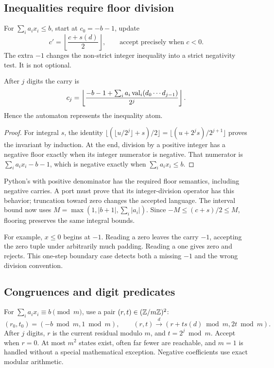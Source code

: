 \subsection{Inequalities require floor division}
For \(\sum_i a_i x_i\le b\), start at \(c_0=-b-1\), update
\begin{equation}\label{eq:le-step}
 c' = \left\lfloor\frac{c+s(d)}2\right\rfloor,
 \qquad\text{accept precisely when }c<0.
\end{equation}
The extra \(-1\) changes the non-strict integer inequality into a strict negativity test. It is not optional.

\begin{lemma}
After \(j\) digits the carry is
\[
 c_j=\left\lfloor\frac{-b-1+\sum_i a_i\operatorname{val}_i(d_0\cdots d_{j-1})}{2^j}\right\rfloor.
\]
Hence the automaton represents the inequality atom.
\end{lemma}
\begin{proof}
For integral \(s\), the identity
\(\lfloor(\lfloor u/2^j\rfloor+s)/2\rfloor
=\lfloor(u+2^j s)/2^{j+1}\rfloor\)
proves the invariant by induction. At the end, division by a positive integer has a negative floor exactly when its integer numerator is negative. That numerator is \(\sum_i a_i x_i-b-1\), which is negative exactly when \(\sum_i a_i x_i\le b\).
\end{proof}

Python's \code{//} with positive denominator has the required floor semantics, including negative carries. A port must prove that its integer-division operator has this behavior; truncation toward zero changes the accepted language. The interval bound now uses \(M=\max(1,|b+1|,\sum_i|a_i|)\). Since \(-M\le(c+s)/2\le M\), flooring preserves the same integral bounds.

For example, \(x\le0\) begins at \(-1\). Reading a zero leaves the carry \(-1\), accepting the zero tuple under arbitrarily much padding. Reading a one gives zero and rejects. This one-step boundary case detects both a missing \(-1\) and the wrong division convention.

\subsection{Congruences and digit predicates}
For \(\sum_i a_i x_i\equiv b\pmod m\), use a pair \((r,t)\in(\mathbb Z/m\mathbb Z)^2\):
\[
 (r_0,t_0)=(-b\bmod m,1\bmod m),\qquad
 (r,t)\xrightarrow{d}(r+t s(d)\bmod m,2t\bmod m).
\]
After \(j\) digits, \(r\) is the current residual modulo \(m\), and \(t=2^j\bmod m\). Accept when \(r=0\). At most \(m^2\) states exist, often far fewer are reachable, and \(m=1\) is handled without a special mathematical exception. Negative coefficients use exact modular arithmetic.

